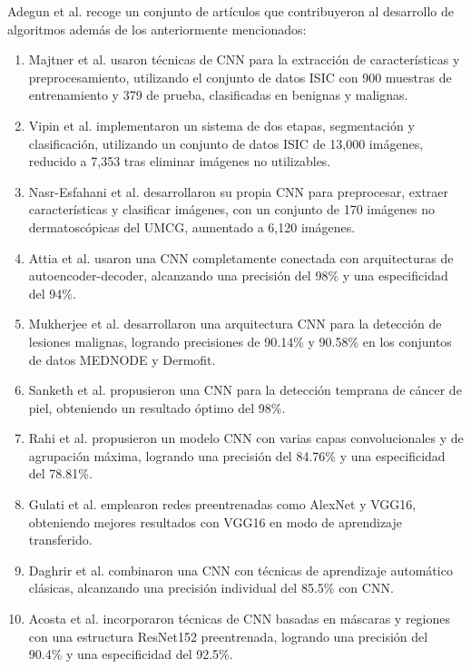 Adegun et al.  recoge un conjunto de artículos que contribuyeron al desarrollo de algoritmos además de los anteriormente mencionados:

\begin{enumerate}
    \item Majtner et al. usaron técnicas de CNN para la extracción de características y preprocesamiento, utilizando el conjunto de datos ISIC con 900 muestras de entrenamiento y 379 de prueba, clasificadas en benignas y malignas. 

    \item Vipin et al.  implementaron un sistema de dos etapas, segmentación y clasificación, utilizando un conjunto de datos ISIC de 13,000 imágenes, reducido a 7,353 tras eliminar imágenes no utilizables. 

    \item Nasr-Esfahani et al.  desarrollaron su propia CNN para preprocesar, extraer características y clasificar imágenes, con un conjunto de 170 imágenes no dermatoscópicas del UMCG, aumentado a 6,120 imágenes. 

    \item Attia et al. usaron una CNN completamente conectada con arquitecturas de autoencoder-decoder, alcanzando una precisión del 98\% y una especificidad del 94\%. 

    \item Mukherjee et al. desarrollaron una arquitectura CNN para la detección de lesiones malignas, logrando precisiones de 90.14\% y 90.58\% en los conjuntos de datos MEDNODE y Dermofit. 

    \item Sanketh et al. propusieron una CNN para la detección temprana de cáncer de piel, obteniendo un resultado óptimo del 98\%. 

    \item Rahi et al. propusieron un modelo CNN con varias capas convolucionales y de agrupación máxima, logrando una precisión del 84.76\% y una especificidad del 78.81\%. 

    \item Gulati et al. emplearon redes preentrenadas como AlexNet y VGG16, obteniendo mejores resultados con VGG16 en modo de aprendizaje transferido.
    \item Daghrir et al. combinaron una CNN con técnicas de aprendizaje automático clásicas, alcanzando una precisión individual del 85.5\% con CNN. 

    \item Acosta et al. incorporaron técnicas de CNN basadas en máscaras y regiones con una estructura ResNet152 preentrenada, logrando una precisión del 90.4\% y una especificidad del 92.5\%.

\end{enumerate}

